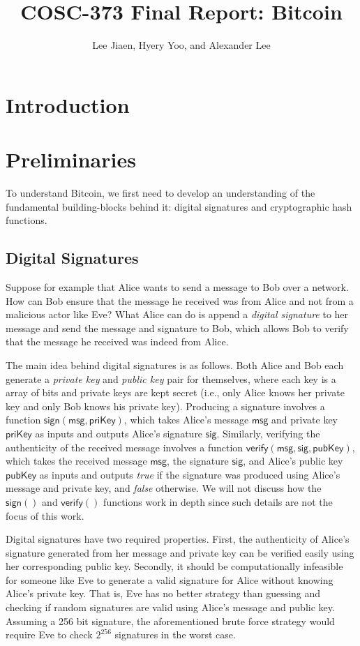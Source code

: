 \documentclass{article}
\title{COSC-373 Final Report: Bitcoin}
\author{Lee Jiaen, Hyery Yoo, and Alexander Lee}
\begin{document}
\maketitle

\section{Introduction}

\section{Preliminaries}

To understand Bitcoin, we first need to develop an understanding of the
fundamental building-blocks behind it: digital signatures and cryptographic hash
functions.

\subsection{Digital Signatures}

Suppose for example that Alice wants to send a message to Bob over a network.
How can Bob ensure that the message he received was from Alice and not from a
malicious actor like Eve? What Alice can do is append a \emph{digital signature}
to her message and send the message and signature to Bob, which allows Bob to
verify that the message he received was indeed from Alice.

The main idea behind digital signatures is as follows. Both Alice and Bob each
generate a \emph{private key} and \emph{public key} pair for themselves, where
each key is a array of bits and private keys are kept secret (i.e., only Alice
knows her private key and only Bob knows his private key). Producing a signature
involves a function $\mathsf{sign(msg, priKey)}$, which takes Alice's message
$\mathsf{msg}$ and private key $\mathsf{priKey}$ as inputs and outputs Alice's
signature $\mathsf{sig}$. Similarly, verifying the authenticity of the received
message involves a function $\mathsf{verify(msg, sig, pubKey)}$, which takes the
received message $\mathsf{msg}$, the signature $\mathsf{sig}$, and Alice's
public key $\mathsf{pubKey}$ as inputs and outputs \emph{true} if the signature
was produced using Alice's message and private key, and \emph{false} otherwise.
We will not discuss how the $\mathsf{sign()}$ and $\mathsf{verify()}$ functions
work in depth since such details are not the focus of this work.

Digital signatures have two required properties. First, the authenticity of
Alice's signature generated from her message and private key can be verified
easily using her corresponding public key. Secondly, it should be
computationally infeasible for someone like Eve to generate a valid signature
for Alice without knowing Alice's private key. That is, Eve has no better
strategy than guessing and checking if random signatures are valid using Alice's
message and public key. Assuming a 256 bit signature, the aforementioned brute
force strategy would require Eve to check $2^{256}$ signatures in the worst
case.
\end{document}
